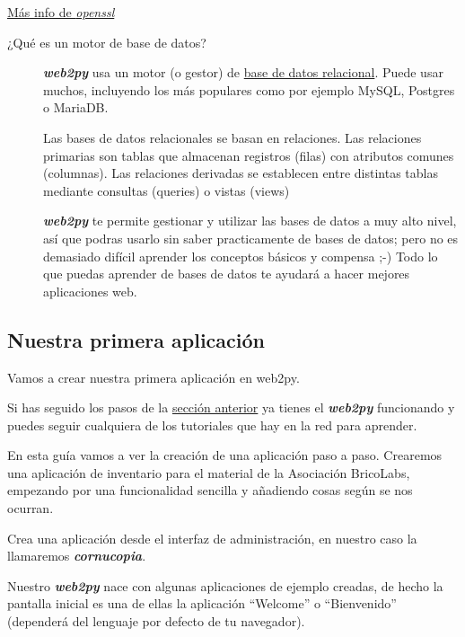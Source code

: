 \documentclass[
  12pt,
  spanish,
]{article}
\begin{document}
\href{https://www.digitalocean.com/community/tutorials/openssl-essentials-working-with-ssl-certificates-private-keys-and-csrs}{Más
info de \emph{openssl}}

\begin{description}
\item[¿Qué es un motor de base de datos?]
\textbf{\emph{web2py}} usa un motor (o gestor) de
\href{https://es.wikipedia.org/wiki/Base_de_datos_relacional}{base de
datos relacional}. Puede usar muchos, incluyendo los más populares como
por ejemplo MySQL, Postgres o MariaDB.

Las bases de datos relacionales se basan en relaciones. Las relaciones
primarias son tablas que almacenan registros (filas) con atributos
comunes (columnas). Las relaciones derivadas se establecen entre
distintas tablas mediante consultas (queries) o vistas (views)

\textbf{\emph{web2py}} te permite gestionar y utilizar las bases de
datos a muy alto nivel, así que podras usarlo sin saber practicamente de
bases de datos; pero no es demasiado difícil aprender los conceptos
básicos y compensa ;-) Todo lo que puedas aprender de bases de datos te
ayudará a hacer mejores aplicaciones web.
\end{description}

\hypertarget{nuestra-primera-aplicaciuxf3n}{%
\subsection{Nuestra primera
aplicación}\label{nuestra-primera-aplicaciuxf3n}}

Vamos a crear nuestra primera aplicación en web2py.

Si has seguido los pasos de la
\protect\hyperlink{instalaciuxf3n}{sección anterior} ya tienes el
\textbf{\emph{web2py}} funcionando y puedes seguir cualquiera de los
tutoriales que hay en la red para aprender.

En esta guía vamos a ver la creación de una aplicación paso a paso.
Crearemos una aplicación de inventario para el material de la Asociación
BricoLabs, empezando por una funcionalidad sencilla y añadiendo cosas
según se nos ocurran.

Crea una aplicación desde el interfaz de administración, en nuestro caso
la llamaremos \textbf{\emph{cornucopia}}.

Nuestro \textbf{\emph{web2py}} nace con algunas aplicaciones de ejemplo
creadas, de hecho la pantalla inicial es una de ellas la aplicación
``Welcome'' o ``Bienvenido'' (dependerá del lenguaje por defecto de tu
navegador).
\end{document}
